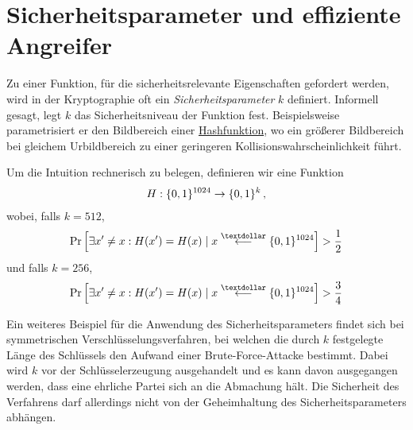 \section{Sicherheitsparameter und effiziente Angreifer}\label{sec:secparam}
Zu einer Funktion, für die sicherheitsrelevante Eigenschaften gefordert werden, wird in der Kryptographie oft ein \emph{Sicherheitsparameter} $k$ definiert. Informell gesagt, legt $k$ das Sicherheitsniveau der Funktion fest. Beispielsweise parametrisiert er den Bildbereich einer \hyperref[cha:hash]{Hashfunktion}, wo ein größerer Bildbereich bei gleichem Urbildbereich zu einer geringeren Kollisionswahrscheinlichkeit führt.
\begin{beispiel}
	Um die Intuition rechnerisch zu belegen, definieren wir eine Funktion
	\begin{align*}
		H : \{0, 1\}^{1024} \rightarrow \{0, 1\}^{k}\, ,
	\end{align*}
	wobei, falls $k = 512$,
	\begin{align*}
		\Pr \left[ \exists x' \neq x : H(x') = H(x) \mid x \stackrel{\textdollar}{\longleftarrow} \{0, 1\}^{1024} \right] > \frac{1}{2}
	\end{align*}
	und falls $k = 256$,
	\begin{align*}
		\Pr \left[ \exists x' \neq x : H(x') = H(x) \mid x \stackrel{\textdollar}{\longleftarrow} \{0, 1\}^{1024} \right] > \frac{3}{4}
	\end{align*}
\end{beispiel}
Ein weiteres Beispiel für die Anwendung des Sicherheitsparameters findet sich bei symmetrischen Verschlüsselungsverfahren, bei welchen die durch $k$ festgelegte Länge des Schlüssels den Aufwand einer Brute-Force-Attacke bestimmt. Dabei wird $k$ vor der Schlüsselerzeugung ausgehandelt und es kann davon ausgegangen werden, dass eine ehrliche Partei sich an die Abmachung hält.
Die Sicherheit des Verfahrens darf allerdings nicht von der Geheimhaltung des Sicherheitsparameters abhängen. 

